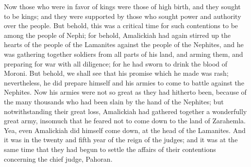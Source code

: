 \bverse \iffalse Now those who were in favor of kings were those of high birth, and they sought to be kings; and they were supported by those who sought power and authority over the people. \fi
Now those who were in favor of kings were those of high birth, and they sought to be kings; and they were supported by those who sought power and authority over the people.
\bverse \iffalse But behold, this was a critical time for such contentions to be among the people of Nephi; for behold, Amalickiah had again stirred up the hearts of the people of the Lamanites against the people of the Nephites, and he was gathering together soldiers from all parts of his land, and arming them, and preparing for war with all diligence; for he had sworn to drink the blood of Moroni. \fi
But behold, this was a critical time for such contentions to be among the people of Nephi; for behold, Amalickiah had again stirred up the hearts of the people of the Lamanites against the people of the Nephites, and he was gathering together soldiers from all parts of his land, and arming them, and preparing for war with all diligence; for he had sworn to drink the blood of Moroni.
\bverse \iffalse But behold, we shall see that his promise which he made was rash; nevertheless, he did prepare himself and his armies to come to battle against the Nephites. \fi
But behold, we shall see that his promise which he made was rash; nevertheless, he did prepare himself and his armies to come to battle against the Nephites.
\bverse \iffalse Now his armies were not so great as they had hitherto been, because of the many thousands who had been slain by the hand of the Nephites; but notwithstanding their great loss, Amalickiah had gathered together a wonderfully great army, insomuch that he feared not to come down to the land of Zarahemla. \fi
Now his armies were not so great as they had hitherto been, because of the many thousands who had been slain by the hand of the Nephites; but notwithstanding their great loss, Amalickiah had gathered together a wonderfully great army, insomuch that he feared not to come down to the land of Zarahemla.
\bverse \iffalse Yea, even Amalickiah did himself come down, at the head of the Lamanites. And it was in the twenty and fifth year of the reign of the judges; and it was at the same time that they had begun to settle the affairs of their contentions concerning the chief judge, Pahoran. \fi
Yea, even Amalickiah did himself come down, at the head of the Lamanites. And it was in the twenty and fifth year of the reign of the judges; and it was at the same time that they had begun to settle the affairs of their contentions concerning the chief judge, Pahoran.
